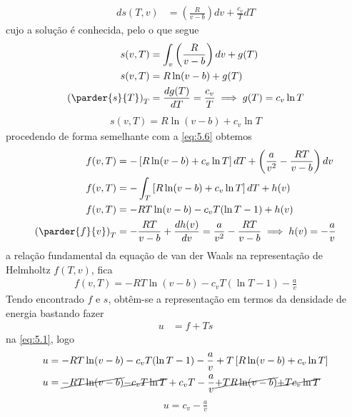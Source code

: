 \begin{prob}
\begin{sol}
		\begin{align}
			ds(T,v)&=\left(\frac{R}{v-b}\right)dv+\frac{c_v}{T}dT
		\end{align}
		cujo a solução é conhecida, pelo o que segue
		\begin{align}
			\begin{split}
				s(v,T)&=\int_{v}\left(\frac{R}{v-b}\right)dv+g(T)\\
				s(v,T)&=R\ln(v-b)+g(T)\\
				\left(\parder{s}{T}\right)_T&=\frac{dg(T)}{dT}=\frac{c_v}{T}\implies g(T)=c_v\ln T								
			\end{split}
		\end{align}
		\begin{align}
			\boxed{
					s(v,T)=R\ln (v-b)+c_v\ln T
				}
		\end{align}
		procedendo de forma semelhante com a \eqref{eq:5.6} obtemos
		\begin{align}
			\begin{split}
				f(v,T)&=-\left[R\ln (v-b)+c_v\ln T\right]dT+\left(\frac{a}{v^2}-\frac{RT}{v-b}\right)dv\\
				f(v,T)&=-\int_T\left[R\ln(v-b)+c_v\ln T\right]dT+h(v)\\
				f(v,T)&=-RT\ln(v-b)-c_vT(\ln T-1)+h(v)\\
				\left(\parder{f}{v}\right)_T&=-\frac{RT}{v-b}+\frac{dh(v)}{dv}=\frac{a}{v^2}-\frac{RT}{v-b}\implies h(v)=-\frac{a}{v}
			\end{split}			
		\end{align}
		a relação fundamental da equação de van der Waals na representação de Helmholtz $f(T,v)$, fica
		\begin{align}
			\boxed{
				f(v,T)=-RT\ln(v-b)-c_vT(\ln T-1)-\frac{a}{v}
			}
		\end{align}
		Tendo encontrado $f$ e $s$, obtêm-se a representação em termos da densidade de energia bastando fazer
		\begin{align}
			u&=f+Ts
		\end{align}
		na \eqref{eq:5.1}, logo
		\begin{align}
			\begin{split}
				u&=-RT\ln(v-b)-c_vT(\ln T-1)-\frac{a}{v}+T\left[R\ln (v-b)+c_v\ln T\right]\\
				u&=\cancel{-RT\ln(v-b)}\cancel{-c_vT\ln T}+c_vT-\frac{a}{v}\cancel{+TR\ln (v-b)}\cancel{+Tc_v\ln T}
			\end{split}
		\end{align}
		\begin{align}
			\boxed{
				u=c_v-\frac{a}{v}
			}
		\end{align}
	\end{sol}
\end{prob}
